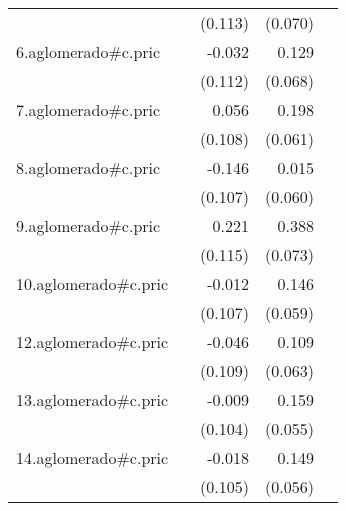 {\begin{longtable}{l*{4}{D{.}{.}{-1}}}
            &                     &     (0.113)         &     (0.070)         &                     \\
\addlinespace
6.aglomerado#c.pric&                     &      -0.032         &       0.129         &                     \\
            &                     &     (0.112)         &     (0.068)         &                     \\
\addlinespace
7.aglomerado#c.pric&                     &       0.056         &       0.198\sym{**} &                     \\
            &                     &     (0.108)         &     (0.061)         &                     \\
\addlinespace
8.aglomerado#c.pric&                     &      -0.146         &       0.015         &                     \\
            &                     &     (0.107)         &     (0.060)         &                     \\
\addlinespace
9.aglomerado#c.pric&                     &       0.221         &       0.388\sym{***}&                     \\
            &                     &     (0.115)         &     (0.073)         &                     \\
\addlinespace
10.aglomerado#c.pric&                     &      -0.012         &       0.146\sym{*}  &                     \\
            &                     &     (0.107)         &     (0.059)         &                     \\
\addlinespace
12.aglomerado#c.pric&                     &      -0.046         &       0.109         &                     \\
            &                     &     (0.109)         &     (0.063)         &                     \\
\addlinespace
13.aglomerado#c.pric&                     &      -0.009         &       0.159\sym{**} &                     \\
            &                     &     (0.104)         &     (0.055)         &                     \\
\addlinespace
14.aglomerado#c.pric&                     &      -0.018         &       0.149\sym{**} &                     \\
            &                     &     (0.105)         &     (0.056)         &                     \\

\end{longtable}}

